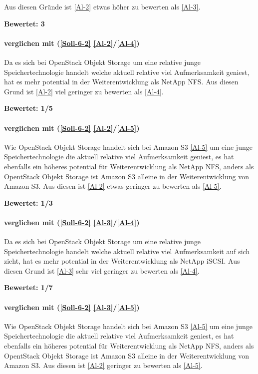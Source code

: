 Aus diesen Gründe ist  \ref{Al-2} etwas höher zu bewerten als  \ref{Al-3}.
 
\textbf{Bewertet: 3}

\paragraph*{  verglichen mit  (\ref{Soll-6-2} \ref{Al-2}/\ref{Al-4})}
Da es sich bei OpenStack Objekt Storage um eine relative junge Speichertechnologie handelt welche aktuell relative viel Aufmerksamkeit geniest, hat es mehr potential in der Weiterentwicklung als NetApp NFS. Aus diesen Grund ist  \ref{Al-2} viel geringer zu bewerten als  \ref{Al-4}.

\textbf{Bewertet: 1/5}

\paragraph*{  verglichen mit  (\ref{Soll-6-2} \ref{Al-2}/\ref{Al-5})}
Wie OpenStack Objekt Storage handelt sich bei Amazon S3 \ref{Al-5} um eine junge Speichertechnologie die aktuell relative viel Aufmerksamkeit geniest, es hat ebenfalls ein höheres potential für Weiterentwicklung als NetApp NFS, anders als OpentStack Objekt Storage ist Amazon S3 alleine in der Weiterentwicklung von Amazon S3. Aus diesen ist  \ref{Al-2} etwas geringer zu bewerten als  \ref{Al-5}.

\textbf{Bewertet: 1/3}

\paragraph*{  verglichen mit  (\ref{Soll-6-2} \ref{Al-3}/\ref{Al-4})}
Da es sich bei OpenStack Objekt Storage um eine relative junge Speichertechnologie handelt welche aktuell relative viel Aufmerksamkeit auf sich zieht, hat es mehr potential in der Weiterentwicklung als NetApp iSCSI. Aus diesen Grund ist  \ref{Al-3} sehr viel geringer zu bewerten als  \ref{Al-4}.

\textbf{Bewertet: 1/7}

\paragraph*{  verglichen mit  (\ref{Soll-6-2} \ref{Al-3}/\ref{Al-5})}
Wie OpenStack Objekt Storage handelt sich bei Amazon S3 \ref{Al-5} um eine junge Speichertechnologie die aktuell relative viel Aufmerksamkeit geniest, es hat ebenfalls ein höheres potential für Weiterentwicklung als NetApp NFS, anders als OpentStack Objekt Storage ist Amazon S3 alleine in der Weiterentwicklung von Amazon S3. Aus diesen ist  \ref{Al-2} geringer zu bewerten als  \ref{Al-5}.


